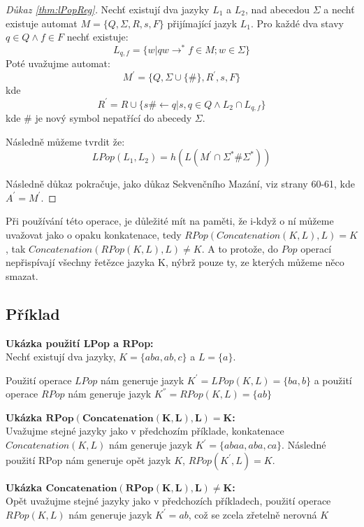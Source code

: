 \begin{proof}[Důkaz \ref{thm:lPopReg}]
	Nechť existují dva jazyky $L_{1}$ a $L_{2}$, nad abecedou $\Sigma$ a nechť existuje automat $M=\{Q,\Sigma,R,s,F\}$ přijímající jazyk $L_{1}$. Pro každé dva stavy $q \in Q \land f \in F$  nechť existuje:
	$$L_{q,f} = \{w|qw\longrightarrow^{*}f \in M; w\in \Sigma\}$$
	Poté uvažujme automat:
	$$M^{'}=\{Q,\Sigma\cup\{\#\},R^{'},s,F\}$$
	kde $$R^{'} = R\cup\{s\#\longleftarrow q|s,q\in Q \land L_{2} \cap L_{q,f}\}$$
	kde $\#$ je nový symbol nepatřící do abecedy $\Sigma$.
	
	Následně můžeme tvrdit že:
	$$LPop(L_{1},L_{2}) = h(L(M^{'} \cap \Sigma^{*}\#\Sigma^{*}))$$
	
	Následně důkaz pokračuje, jako důkaz Sekvenčního Mazání, viz \cite{lilaKari} strany 60-61, kde $A^{'}=M^{'}$.
\end{proof}

Při používání této operace, je důležité mít na paměti, že i-když o ní můžeme uvažovat jako o opaku konkatenace, tedy $RPop(Concatenation(K,L),L) = K$, tak $Concatenation(RPop(K,L),L) \neq K$. A to protože, do $Pop$ operací nepřispívají všechny řetězce jazyka K, nýbrž pouze ty, ze kterých můžeme něco smazat.

\subsection{Příklad}
\textbf{Ukázka použití LPop a RPop:}\\
Nechť existují dva jazyky, $K=\{aba,ab,c\}$ a $L=\{a\}$.

Použití operace $LPop$ nám generuje jazyk $K^{'}=LPop(K,L) =\{ba,b\}$ a použití operace $RPop$ nám generuje jazyk $K^{''}=RPop(K,L) =\{ab\}$

\textbf{Ukázka $\mathbf{RPop(Concatenation(K,L),L) = K}$:}\\
Uvažujme stejné jazyky jako v předchozím příklade, konkatenace $Concatenation(K,L)$ nám generuje jazyk $K^{'}=\{abaa,aba,ca\}$. Následné použití RPop nám generuje opět jazyk $K$, $RPop(K^{'}, L) = K$.

\textbf{Ukázka $\mathbf{Concatenation(RPop(K,L),L) \neq K}$:}\\
Opět uvažujme stejné jazyky jako v předchozích příkladech, použití operace $RPop(K,L)$ nám generuje jazyk $K^{'}={ab}$, což se zcela zřetelně nerovná $K$